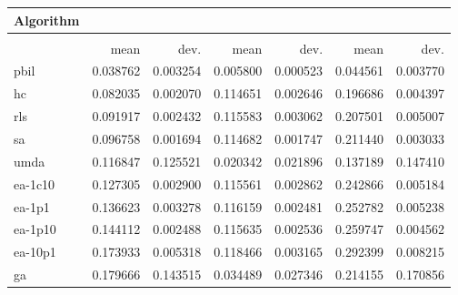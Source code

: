 \begin{tabular}{@{} l *{6}{>{{}}N{1}{2}} @{}}
\toprule
{Algorithm} &  \\
\midrule
&  &  &  \\
\midrule
& {mean} & {dev.} & {mean} & {dev.} & {mean} & {dev.} \\
\midrule
pbil & 0.038762 & 0.003254 & 0.005800 & 0.000523 & 0.044561 & 0.003770 \\
hc & 0.082035 & 0.002070 & 0.114651 & 0.002646 & 0.196686 & 0.004397 \\
rls & 0.091917 & 0.002432 & 0.115583 & 0.003062 & 0.207501 & 0.005007 \\
sa & 0.096758 & 0.001694 & 0.114682 & 0.001747 & 0.211440 & 0.003033 \\
umda & 0.116847 & 0.125521 & 0.020342 & 0.021896 & 0.137189 & 0.147410 \\
ea-1c10 & 0.127305 & 0.002900 & 0.115561 & 0.002862 & 0.242866 & 0.005184 \\
ea-1p1 & 0.136623 & 0.003278 & 0.116159 & 0.002481 & 0.252782 & 0.005238 \\
ea-1p10 & 0.144112 & 0.002488 & 0.115635 & 0.002536 & 0.259747 & 0.004562 \\
ea-10p1 & 0.173933 & 0.005318 & 0.118466 & 0.003165 & 0.292399 & 0.008215 \\
ga & 0.179666 & 0.143515 & 0.034489 & 0.027346 & 0.214155 & 0.170856 \\
\bottomrule
\end{tabular}
